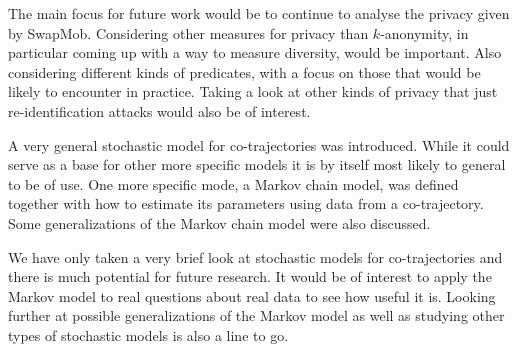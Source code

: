 \documentclass[12pt]{article}
\theoremstyle{definition}
\begin{document}
The main focus for future work would be to continue to analyse the
privacy given by SwapMob. Considering other measures for privacy than
\(k\)-anonymity, in particular coming up with a way to measure
diversity, would be important. Also considering different kinds of
predicates, with a focus on those that would be likely to encounter in
practice. Taking a look at other kinds of privacy that just
re-identification attacks would also be of interest.

A very general stochastic model for co-trajectories was introduced.
While it could serve as a base for other more specific models it is by
itself most likely to general to be of use. One more specific mode, a
Markov chain model, was defined together with how to estimate its
parameters using data from a co-trajectory. Some generalizations of
the Markov chain model were also discussed.

We have only taken a very brief look at stochastic models for
co-trajectories and there is much potential for future research. It
would be of interest to apply the Markov model to real questions about
real data to see how useful it is. Looking further at possible
generalizations of the Markov model as well as studying other types of
stochastic models is also a line to go.



\end{document}
